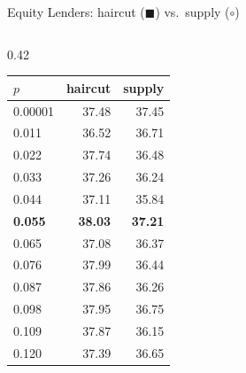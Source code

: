\documentclass[aspectratio=169,10pt]{beamer}
\begin{document}
\begin{frame}{Equity Lenders: haircut ($\blacksquare$) vs.\ supply ($\circ$)}
\begin{columns}[T]
\begin{column}{0.42\textwidth}
\begin{tabular}{lrr}
        $p$ & haircut & supply \\
        \midrule
        0.00001 & 37.48 & 37.45 \\
        0.011 & 36.52 & 36.71 \\
        0.022 & 37.74 & 36.48 \\
        0.033 & 37.26 & 36.24 \\
        0.044 & 37.11 & 35.84 \\
        \textbf{0.055} & \textbf{38.03} & \textbf{37.21} \\
        0.065 & 37.08 & 36.37 \\
        0.076 & 37.99 & 36.44 \\
        0.087 & 37.86 & 36.26 \\
        0.098 & 37.95 & 36.75 \\
        0.109 & 37.87 & 36.15 \\
        0.120 & 37.39 & 36.65 \\
        \bottomrule
      \end{tabular}
    \end{column}
  \end{columns}
\end{frame}
\end{document}
